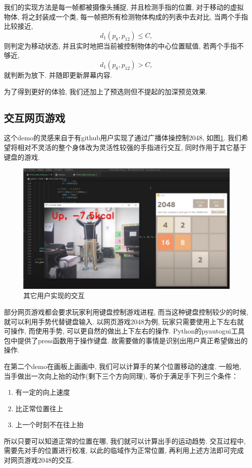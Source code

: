 \documentclass[lang=cn,11pt,a4paper]{elegantpaper}
\begin{document}
我们的实现方法是每一帧都被摄像头捕捉, 并且检测手指的位置, 对于移动的虚拟物体, 
将之封装成一个类, 每一帧把所有检测物体构成的列表中去对比, 当两个手指比较接近,
\[d_{1} (p_8, p_{12}) \leq C,\] 
则判定为移动状态, 并且实时地把当前被控制物体的中心位置赋值, 若两个手指不够近,
\[d_{1} (p_8, p_{12}) > C,\]
就判断为放下. 并随即更新屏幕内容. 

为了得到更好的体验, 我们还加上了预选则但不提起的加深预览效果.

\subsection{交互网页游戏}
这个demo的灵感来自于有github用户实现了通过广播体操控制2048, 如图\ref{gm4}. 
我们希望将相对不灵活的整个身体改为灵活性较强的手指进行交互, 同时作用于其它基于键盘的游戏. 
\begin{figure}[htb]
  \centering
  \includegraphics[width=.8\textwidth]{imgs/h2048.png}
  \caption{其它用户实现的交互\label{gm4}}
\end{figure}

部分网页游戏都会要求玩家利用键盘控制游戏进程, 而当这种键盘控制较少的时候, 
就可以利用手势代替键盘输入. 以网页游戏2048为例, 玩家只需要使用上下左右就可操作, 
而使用手势, 可以更自然的做出上下左右的操作. 
Python的pyautogui工具包中提供了press函数用于操作键盘. 
故需要做的事情是识别出用户真正希望做出的操作. 

在第二个demo在画板上画画中, 我们可以计算手的某个位置移动的速度. 
一般地, 当手做出一次向上抬的动作(剩下三个方向同理), 等价于满足手下列三个条件：
\begin{enumerate}
  \item 有一定的向上速度
  \item 比正常位置往上
  \item 上一个时刻不在往上抬
\end{enumerate}

所以只要可以知道正常的位置在哪, 我们就可以计算出手的运动趋势. 
交互过程中, 需要先对手的位置进行校准, 以此的临域作为正常位置, 
再利用上述方法即可完成对网页游戏2048的交互. 
\end{document}
